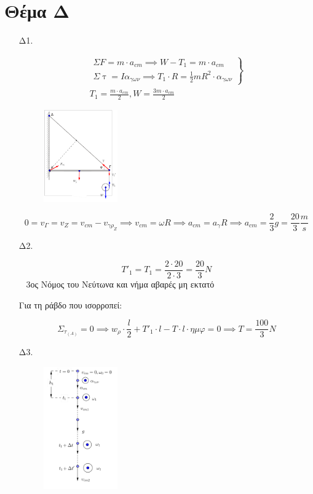 \documentclass[12pt]{article}
\begin{document}
  \section*{Θέμα Δ}

  \begin{enumerate}
    \item [Δ1.]

    \begin{gather*}
      \left. \begin{matrix}ΣF=m\cdot a_{cm}\implies W-T_1=m\cdot a_{cm} \\ Σ\uptau=Iα_{γων}\implies T_1\cdot R=\frac{1}{2}mR^2\cdot α_{γων}\end{matrix} \right\} \\
      T_1=\frac{m\cdot a_{cm}}{2},W=\frac{3m\cdot a_{cm}}{2}
    \end{gather*}

    \begin{figure}[h]
      \includegraphics[width=0.3\textwidth]{ΦυσικήΔ1.png}
      \centering
    \end{figure}

    $$0=v_Γ=v_Z=v_{cm}-v_{γρ_Ζ}\implies v_{cm}=ωR\implies a_{cm}=a_γ R\implies a_{cm}=\frac{2}{3}g=\frac{20}{3}\frac{m}{s}$$

    \item [Δ2.]

    $$T'_1=T_1=\frac{2\cdot 20}{2\cdot 3}=\frac{20}{3}N$$
  
    3ος Νόμος του Νεύτωνα και νήμα αβαρές μη εκτατό

    Για τη ράβδο που ισορροπεί:

    $$Σ_{τ_{(Α)}}=0\implies w_ρ\cdot\frac{l}{2}+T'_1\cdot l-T\cdot l\cdot ημφ=0\implies T=\frac{100}{3}N$$

    \item [Δ3.]


    \begin{figure}[h]
      \includegraphics[width=0.3\textwidth]{ΦυσικήΔ3.png}
      \centering
    \end{figure}


\end{enumerate}
\end{document}
